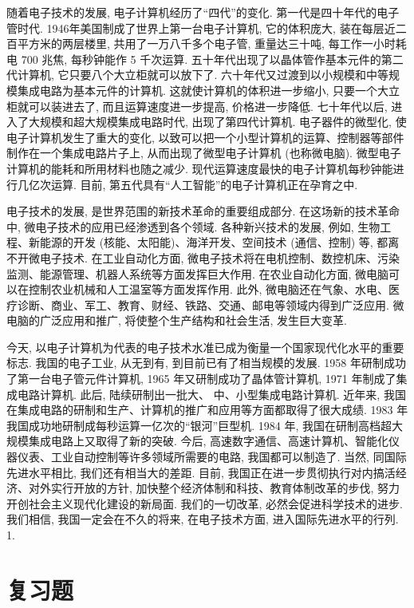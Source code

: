 \documentclass[10pt]{article}
\begin{document}
随着电子技术的发展, 电子计算机经历了“四代”的变化. 第一代是四十年代的电子管时代. 1946年美国制成了世界上第一台电子计算机, 它的体积庞大, 装在每层近二百平方米的两层楼里, 共用了一万八千多个电子管, 重量达三十吨, 每工作一小时耗电 700 兆焦, 每秒钟能作 5 千次运算. 五十年代出现了以晶体管作基本元件的第二代计算机, 它只要八个大立柜就可以放下了. 六十年代又过渡到以小规模和中等规模集成电路为基本元件的计算机. 这就使计算机的体积进一步缩小, 只要一个大立柜就可以装进去了, 而且运算速度进一步提高, 价格进一步降低. 七十年代以后, 进入了大规模和超大规模集成电路时代, 出现了第四代计算机. 电子器件的微型化, 使电子计算机发生了重大的变化, 以致可以把一个小型计算机的运算、控制器等部件制作在一个集成电路片子上, 从而出现了微型电子计算机 (也称微电脑). 微型电子计算机的能耗和所用材料也随之减少. 现代运算速度最快的电子计算机每秒钟能进行几亿次运算. 目前, 第五代具有“人工智能”的电子计算机正在孕育之中.

电子技术的发展, 是世界范围的新技术革命的重要组成部分. 在这场新的技术革命中, 微电子技术的应用已经渗透到各个领域. 各种新兴技术的发展, 例如, 生物工程、新能源的开发 (核能、太阳能)、海洋开发、空间技术 (通信、控制) 等, 都离不开微电子技术. 在工业自动化方面, 微电子技术将在电机控制、数控机床、污染监测、能源管理、机器人系统等方面发挥巨大作用. 在农业自动化方面, 微电脑可以在控制农业机械和人工温室等方面发挥作用. 此外, 微电脑还在气象、水电、医疗诊断、商业、军工、教育、财经、铁路、交通、邮电等领域内得到广泛应用. 微电脑的广泛应用和推广, 将使整个生产结构和社会生活, 发生巨大变革.

今天, 以电子计算机为代表的电子技术水准已成为衡量一个国家现代化水平的重要标志. 我国的电子工业, 从无到有, 到目前已有了相当规模的发展. 1958 年研制成功了第一台电子管元件计算机, 1965 年又研制成功了晶体管计算机, 1971 年制成了集成电路计算机. 此后, 陆续研制出一批大、 中、小型集成电路计算机. 近年来, 我国在集成电路的研制和生产、计算机的推广和应用等方面都取得了很大成绩. 1983 年我国成功地研制成每秒运算一亿次的“银河”巨型机. 1984 年, 我国在研制高档超大规模集成电路上又取得了新的突破. 今后, 高速数字通信、高速计算机、智能化仪器仪表、工业自动控制等许多领域所需要的电路, 我国都可以制造了. 当然, 同国际先进水平相比, 我们还有相当大的差距. 目前, 我国正在进一步贯彻执行对内搞活经济、对外实行开放的方针, 加快整个经济体制和科技、教育体制改革的步伐, 努力开创社会主义现代化建设的新局面. 我们的一切改革, 必然会促进科学技术的进步. 我们相信, 我国一定会在不久的将来, 在电子技术方面, 进入国际先进水平的行列. 1.

\section*{复习题}
\end{document}
